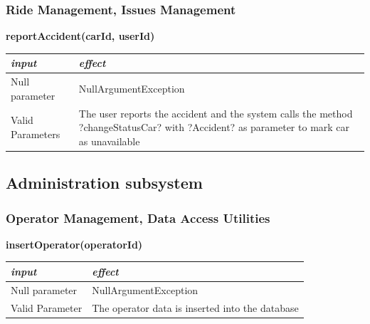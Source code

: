 \documentclass{article}
\begin{document}
\begin{flushleft}
       
         \subsubsection{Ride Management, Issues Management}
         
          
           \begin{center}
   \begin {flushleft}
    \textbf{reportAccident(carId, userId)}
    \end{flushleft}
        \begin{tabular}{  |  p{6cm} | p{6cm} |}
    \hline
    \textit{input} &  \textit{effect} \\
    \hline
    
    Null parameter & NullArgumentException
     \\ 
  \hline
  Valid Parameters &  The user reports the accident and the system calls the method ?changeStatusCar? with ?Accident? as parameter to mark car as unavailable \\
  \hline

    \end{tabular}
\end{center} 
           
           
       
      
   \subsection{Administration subsystem} %
    \subsubsection{Operator Management, Data Access Utilities}
    
       
  \begin{center}
   \begin {flushleft}
    \textbf{insertOperator(operatorId)}
    \end{flushleft}
        \begin{tabular}{  |  p{6cm} | p{6cm} |}
    \hline
    \textit{input} &  \textit{effect} \\
    \hline
    
      Null parameter & NullArgumentException
     \\ 
  \hline
   Valid Parameter &   The operator data is inserted into the database\\
  \hline

    \end{tabular}
\end{center}



\end{flushleft}
\end{document}
